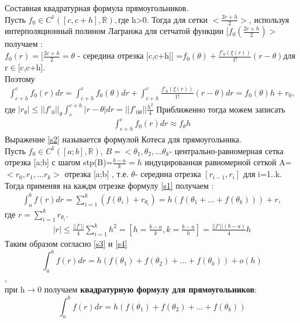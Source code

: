 \documentclass[__main__.tex]{subfiles}
\begin{document}
Составная квадратурная формула прямоугольников.\\

Пусть $f_{0}\in C^{1}([c,c+h],\mathbb{R}),$где h>0. Тогда для сетки $<\frac{2c+h}{2}>$, используя интерполяционный полином Лагранжа для сетчатой функции $[f_{0}(\frac{2c+h}{2})>$ получаем :\\

	$f_{0}(r)=[\frac{2c+h}{2}=\theta$ - середина отрезка [c,c+h]] =$f_{0}(\theta)+\frac{f'_{0}(\xi(r))}{1!}(r-\theta)$для r$\in$[c,c+h].\\
Поэтому 
\begin{gather}
	\label{s1}
	\int_{c+h}^{c}f_{0}(r)dr=\int_{c+h}^{c}f_{0}(\theta)dr+\int_{c+h}^{c}\frac{f'_{0}(\xi(r))}{1!}(r-\theta)dr=f_{0}(\theta)h+r_{0},
\end{gather}
где $|r_{\theta}|\leq ||f'_{0}||_{\theta} \int_{c}^{c+h}|r-\theta|dr=||f'_{0\theta}||\frac{h^{2}}{4}$
Приближенно тогда можем записать
\begin{gather}
	\label{s2}
	 \int_{c+h}^{c}f_{0}(r)dr\approx f_{\theta}h
	 \end{gather}
 Выражение \ref{s2} называется формулой Котеса для прямоугольника.\\
 Пусть  $f_{0}\in C^{1}([a;b],\mathbb{R})$, $B=<\theta_{1},\theta_{2},...\theta_{k}$- центрально-равномерная сетка отрезка [a;b] с шагом stp(B)=$\frac{b-a}{k}=h$ индуцированная равномерной сеткой A=$<r_{0},r_{1},...r_{k}>$ отрезка [a;b] , т.е. $\theta$- середина отрезка $[r_{i-1},r_{i}]$ для i=1..k. Тогда применяя на каждм отрезке формулу \ref{s1} получаем :
 \begin{gather}
 	\label{s3}
 	\int_{a}^{b}f(r)dr=\sum_{i=1}^{k}(f(\theta_{i})+r_{\theta_{i}})=h(f(\theta_{1}+...+f(\theta_{k})))+r,
 	\end{gather}
 где $r=\sum_{i=1}^{k}r_{\theta_{i}}$.
 \begin{gather}
 	\label{s4}
 	|r|\leq\frac{||f'||}{4}\sum_{i=1}^{k}h^2=[ h=\frac{b-a}{k}, k=\frac{b-a}{h} ]=\frac{||f'|| (b-a)}{4}h
 	\end{gather}
 Таким образом согласно \ref{s3} и \ref{s4} 
 $$\int_{a}^{b}f(r)dr=h(f(\theta_{1})+f(\theta_{2})+...+f(\theta_{k}))+ o(h)$$,\\
 
 при h$\rightarrow$0 получаем \textbf{квадратурную формулу для прямоугольников}:
 $$\int_{a}^{b}f(r)dr=h(f(\theta_{1})+f(\theta_{2})+...+f(\theta_{k}))$$
\end{document}
